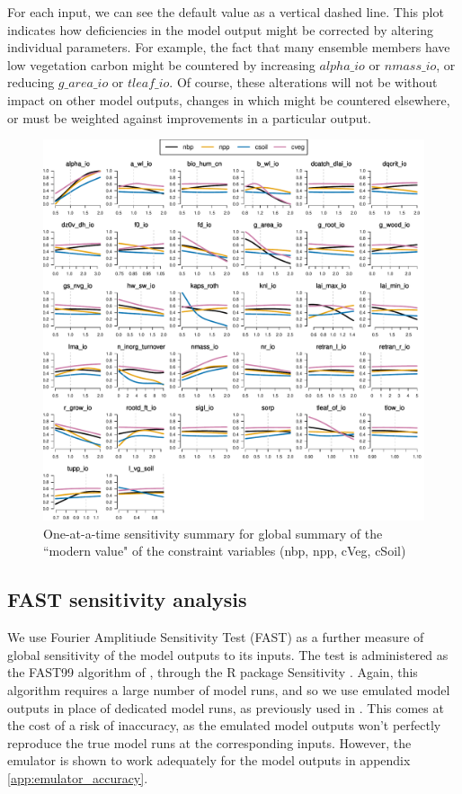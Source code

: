 \documentclass[gmd, manuscript]{copernicus}
\begin{document}
For each input, we can see the default value as a vertical dashed line. This plot indicates how deficiencies in the model output might be corrected by altering individual parameters. For example, the fact that many ensemble members have low vegetation carbon might be countered by increasing $alpha\_io$ or $nmass\_io$, or reducing $g\_area\_io$ or $tleaf\_io$. Of course, these alterations will not be without impact on other model outputs, changes in which might be countered elsewhere, or must be weighted against improvements in a particular output.

\begin{figure}[t]
\includegraphics[width=12cm]{./figs/fig11.pdf}
\caption{One-at-a-time sensitivity summary for global summary of the ``modern value" of the constraint variables (nbp, npp, cVeg, cSoil)}
\label{fig:Y_oaat_const_level1a_wave01_scaled_norm}
\end{figure}

\subsection{FAST sensitivity analysis}\label{ssec:sa_fast}

We use Fourier Amplitiude Sensitivity Test (FAST) as a further measure of global sensitivity of the model outputs to its inputs. The test is administered as the FAST99 algorithm of \cite{saltelli1999sensitivity}, through the R package Sensitivity \citep{Rpackage2015sensitivity}. Again, this algorithm requires a large number of model runs, and so we use emulated model outputs in place of dedicated model runs, as previously used in \cite{mcneall2020correcting, mcneall2016impact, carslaw2013large}. This comes at the cost of a risk of inaccuracy, as the emulated model outputs won't perfectly reproduce the true model runs at the corresponding inputs. However, the emulator is shown to work adequately for the model outputs in appendix \ref{app:emulator_accuracy}. 
\end{document}
